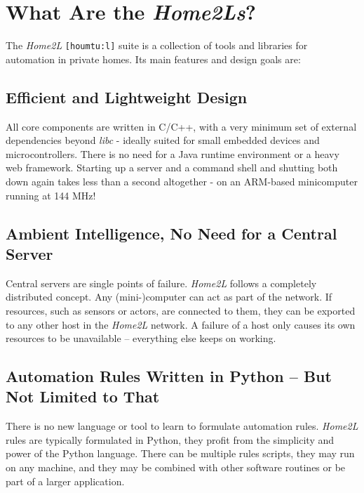 \documentclass[12pt,english,parskip=half,headheight=19pt]{scrreprt}
\begin{document}
\section{What Are the \textit{Home2Ls}?}
\label{sec:intro-overview}


The \textit{Home2L} \texttt{[houmtu:l]} suite is a collection of tools and libraries for automation in private homes. Its main features and design goals are:


\subsection*{Efficient and Lightweight Design}

All core components are written in C/C++, with a very minimum set of external dependencies beyond \textit{libc} - ideally suited for small embedded devices and microcontrollers. There is no need for a Java runtime environment or a heavy web framework. Starting up a server and a command shell and shutting both down again takes less than a second altogether - on an ARM-based minicomputer running at 144 MHz!


\subsection*{Ambient Intelligence, No Need for a Central Server}

Central servers are single points of failure. \textit{Home2L} follows a completely distributed concept. Any (mini-)computer can act as part of the network. If resources, such as sensors or actors, are connected to them, they can be exported to any other host in the \textit{Home2L} network. A failure of a host only causes its own resources to be unavailable -- everything else keeps on working.


\subsection*{Automation Rules Written in Python -- But Not Limited to That}

There is no new language or tool to learn to formulate automation rules. \textit{Home2L} rules are typically formulated in Python, they profit from the simplicity and power of the Python language. There can be multiple rules scripts, they may run on any machine, and they may be combined with other software routines or be part of a larger application.
\end{document}
